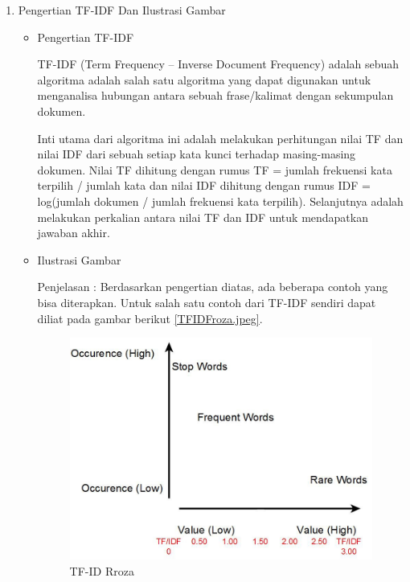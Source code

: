 \begin{enumerate}
\item Pengertian TF-IDF Dan Ilustrasi Gambar
\begin{itemize}
\item  Pengertian TF-IDF
\par TF-IDF  (Term Frequency – Inverse Document Frequency) adalah  sebuah algoritma  adalah salah satu algoritma yang dapat digunakan untuk menganalisa hubungan antara sebuah frase/kalimat dengan sekumpulan dokumen. 
\par Inti utama dari algoritma ini adalah melakukan perhitungan nilai TF dan nilai IDF dari sebuah setiap kata kunci terhadap masing-masing dokumen. Nilai TF dihitung dengan rumus TF = jumlah frekuensi kata terpilih / jumlah kata dan nilai IDF dihitung dengan rumus IDF = log(jumlah dokumen / jumlah frekuensi kata terpilih). Selanjutnya adalah melakukan perkalian antara nilai TF dan IDF untuk mendapatkan jawaban akhir.
\item Ilustrasi Gambar
\par Penjelasan : Berdasarkan pengertian diatas, ada beberapa contoh yang bisa diterapkan. Untuk salah satu contoh dari TF-IDF sendiri dapat diliat pada gambar berikut \ref{TFIDFroza.jpeg}.
\begin{figure}[!hbtp]
\centering
\includegraphics[scale=0.2]{figures/TFIDFroza.jpeg}
\caption{TF-ID Rroza}
\label{tf-fadila}
\end{figure}
\par
\end{itemize}
\par
\par


\end{enumerate}
